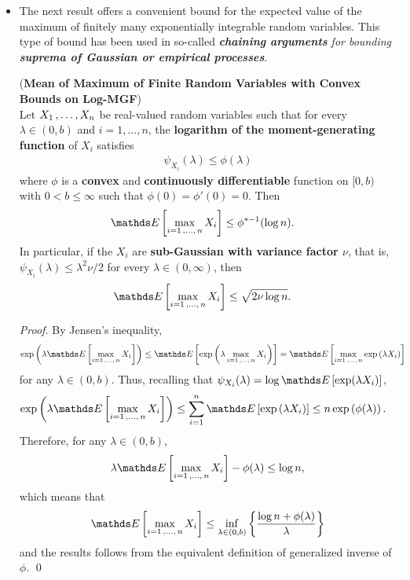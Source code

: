 \documentclass[11pt]{article}
\begin{document}
\begin{itemize}
\item The next result offers a convenient bound for the expected value of the maximum of finitely many exponentially integrable random variables. This type of bound has been used  in so-called \emph{\textbf{chaining arguments} for bounding \textbf{suprema of Gaussian or empirical processes}}.
\begin{proposition} (\textbf{Mean of Maximum of Finite Random Variables with Convex Bounds on Log-MGF}) \citep{boucheron2013concentration}\\
Let $X_1 \,{,}\ldots{,}\, X_n$ be real-valued random variables such that for every $\lambda \in (0, b)$ and $i = 1, . . . , n$, the \textbf{logarithm of the moment-generating function} of $X_i$ satisfies
\begin{align}
\psi_{X_i}(\lambda) \le \phi(\lambda) \label{ineqn: bounded_by_convex_surrogate}
\end{align} where $\phi$ is a \textbf{convex} and \textbf{continuously differentiable} function on $[0, b)$ with $0 < b \le \infty$ such that $\phi(0) = \phi'(0) = 0$. Then
\begin{align}
\E{}{\max\limits_{i=1 \xdotx{,} n} X_i} &\le \phi^{*-1}(\log n).  \label{ineqn: maximal_finite_generalized_inverse_legendre_transform}
\end{align} In particular, if the $X_i$ are \textbf{sub-Gaussian with variance factor $\nu$}, that is, $\psi_{X_i}(\lambda) \le \lambda^2 \nu/2$ for
every $\lambda \in (0, \infty)$, then
\begin{align*}
\E{}{\max\limits_{i=1 \xdotx{,} n} X_i} &\le \sqrt{2 \nu \log n}.
\end{align*}
\end{proposition}
\begin{proof}
By Jensen's inequality, 
\begin{align*}
\exp\paren{\lambda \E{}{\max\limits_{i=1 \xdotx{,} n} X_i}} &\le \E{}{\exp\paren{\lambda \max\limits_{i=1 \xdotx{,} n} X_i }} =  \E{}{\max\limits_{i=1 \xdotx{,} n}  \exp\paren{\lambda X_i }}
\end{align*} for any $\lambda \in (0, b)$. Thus, recalling that $\psi_{X_i}(\lambda) = \log \E{}{\exp (\lambda X_i)}$,
\begin{align*}
\exp\paren{\lambda \E{}{\max\limits_{i=1 \xdotx{,} n} X_i}}  &\le  \sum_{i=1}^{n} \E{}{ \exp\paren{\lambda X_i }} \le n  \exp\paren{\phi(\lambda)}.
\end{align*} Therefore, for any $\lambda \in (0, b)$,
\begin{align*}
\lambda\E{}{\max\limits_{i=1 \xdotx{,} n} X_i} - \phi(\lambda) \le \log n,
\end{align*} which means that
\begin{align*}
\E{}{\max\limits_{i=1 \xdotx{,} n} X_i} \le \inf_{\lambda \in (0, b)}\set{ \frac{\log n +  \phi(\lambda)}{\lambda}}
\end{align*} and the results follows from the equivalent definition of generalized inverse of $\phi$. \qed
\end{proof}



\end{itemize}
\end{document}
